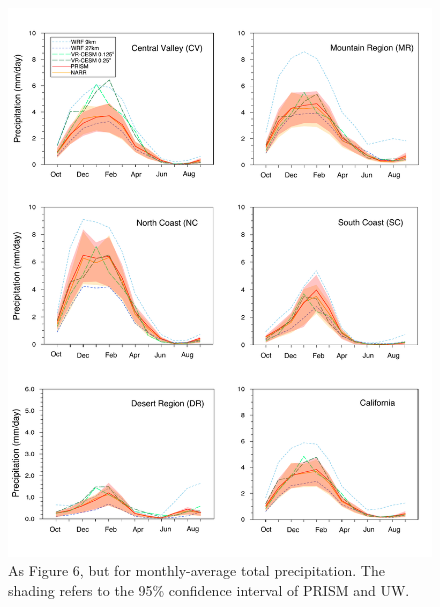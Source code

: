 \documentclass[draft,ms]{agutex}   %
\begin{document}
\begin{figure}
\begin{center}
\includegraphics[width=6in]{trd_pr_allzones.pdf}
\end{center}
\caption{As Figure 6, but for monthly-average total precipitation. The shading refers to the 95\% confidence interval of PRISM and UW.} \label{fig:Figure 11}
\end{figure}
\end{document}
